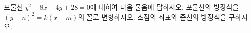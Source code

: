 포물선 $y^2-8x-4y+28=0$에 대하여 다음 물음에 답하시오.
 포물선의 방정식을 $(y-n)^2=k(x-m)$의 꼴로 변형하시오.
 초점의 좌표와 준선의 방정식을 구하시오.
